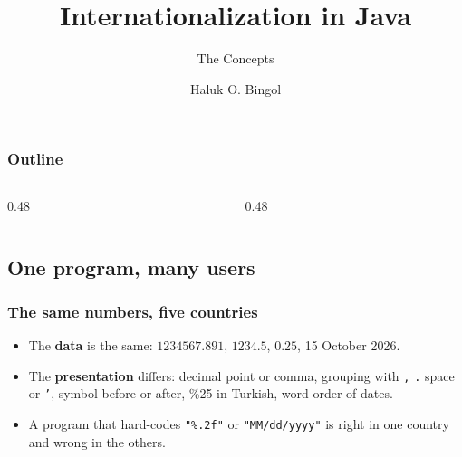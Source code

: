 \documentclass[aspectratio=169,10pt,compress]{beamer}
\title{Internationalization in Java}
\subtitle{The Concepts}
\author[Bingol]{Haluk O. Bingol}
\institute[FCIS]{
    Faculty of Computer and Information Sciences\\
    Yeditepe University
}
\date{
	{\tiny \hbTimeStamp}
}
\begin{document}
\begin{frame}[t,fragile]
  \titlepage
\end{frame}




\begin{frame}[t,fragile] \frametitle{Outline}
  \begin{columns}[T]
    \begin{column}{0.48\textwidth}
      \tableofcontents[sections={1-4}, hideallsubsections]
    \end{column}
    \begin{column}{0.48\textwidth}
      \tableofcontents[sections={5-20}, hideallsubsections]
    \end{column}
  \end{columns}
\end{frame}


\subsection[Problem]{One program, many users}




\begin{frame}[t,fragile] \frametitle{The same numbers, five countries}
  \vspace{0.2em}
  \begin{itemize}\small
    \item The \textbf{data} is the same: $1234567.891$, $1234.5$, $0.25$, 15 October 2026.
    \item The \textbf{presentation} differs: decimal point or comma, grouping with
      \texttt{,} \texttt{.} space or \texttt{'}, symbol before or after, \%25 in Turkish, word order of dates.
    \item A program that hard-codes \texttt{"\%.2f"} or \texttt{"MM/dd/yyyy"} is right in one country and wrong in the others.
  \end{itemize}
\end{frame}
\end{document}
